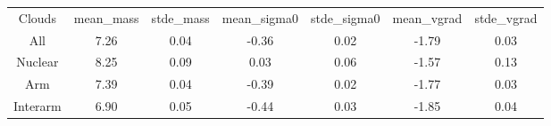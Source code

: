 \begin{table}
\begin{tabular}{ccccccc}
Clouds & mean_mass & stde_mass & mean_sigma0 & stde_sigma0 & mean_vgrad & stde_vgrad \\
All & 7.26 & 0.04 & -0.36 & 0.02 & -1.79 & 0.03 \\
Nuclear & 8.25 & 0.09 & 0.03 & 0.06 & -1.57 & 0.13 \\
Arm & 7.39 & 0.04 & -0.39 & 0.02 & -1.77 & 0.03 \\
Interarm & 6.90 & 0.05 & -0.44 & 0.03 & -1.85 & 0.04 \\
\end{tabular}
\end{table}
